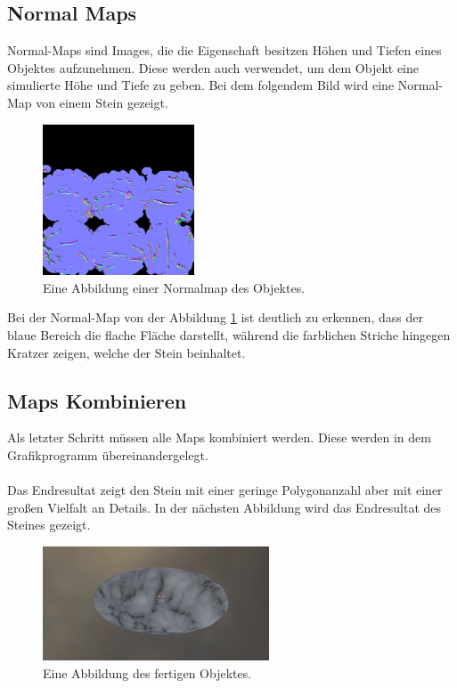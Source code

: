 \subsection{Normal Maps}

Normal-Maps sind Images, die die Eigenschaft besitzen Höhen und Tiefen eines Objektes aufzunehmen. Diese werden auch verwendet, um dem Objekt eine simulierte Höhe und Tiefe zu geben. Bei dem folgendem Bild wird eine Normal-Map von einem Stein gezeigt.

\begin{figure}[H]
    \centering
    \includegraphics[width=0.4\textwidth]{chapters/11/Images/SteinNormal.png}
    \caption{Eine Abbildung einer Normalmap des Objektes.}
    \label{htl90}
\end{figure}

\noindent Bei der Normal-Map von der Abbildung \ref{htl90} ist deutlich zu erkennen, dass der blaue Bereich die flache Fläche darstellt, während die farblichen Striche hingegen Kratzer zeigen, welche der Stein beinhaltet.

\subsection{Maps Kombinieren}

Als letzter Schritt müssen alle Maps kombiniert werden. Diese werden in dem Grafikprogramm übereinandergelegt.\\\\
Das Endresultat zeigt den Stein mit einer geringe Polygonanzahl aber mit einer großen Vielfalt an Details. In der nächsten Abbildung wird das Endresultat des Steines gezeigt.

\begin{figure}[H]
    \centering
    \includegraphics[width=0.6\textwidth]{chapters/11/Images/SteinCombi.png}
    \caption{Eine Abbildung des fertigen Objektes.}
    \label{htl01}
\end{figure}

